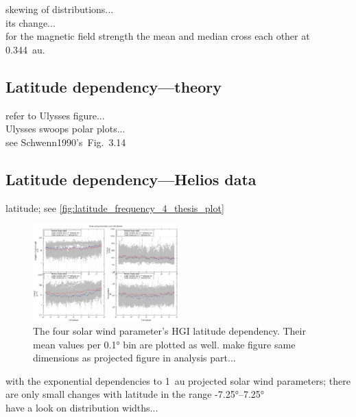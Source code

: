 skewing of distributions...\\
its change...\\
for the magnetic field strength the mean and median cross each other at 0.344~au.\\

\subsection{Latitude dependency---theory}
refer to Ulysses figure...\\
Ulysses swoops polar plots...\\
see Schwenn1990's~Fig.~3.14\\

\subsection{Latitude dependency---Helios data}
latitude; see \autoref{fig:latitude_frequency_4_thesis_plot}
\begin{figure}[htb]
	\centering
	\includegraphics[width=0.5\textwidth]{images/gnuplots/latitude_frequency_4_thesis_plot.png}
	\caption{The four solar wind parameter's HGI latitude dependency. Their mean values per 0.1° bin are plotted as well. make figure same dimensions as projected figure in analysis part...}
	\label{fig:latitude_frequency_4_thesis_plot}
\end{figure}

with the exponential dependencies to 1~au projected solar wind parameters; there are only small changes with latitude in the range -7.25°--7.25°\\
have a look on distribution widths...\\


